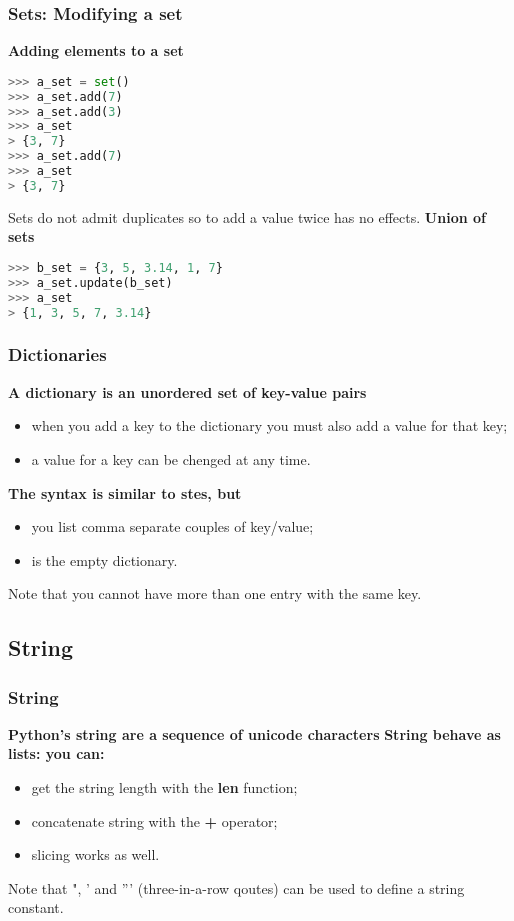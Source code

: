 \subsubsection{Sets: Modifying a set}
\textbf{Adding elements to a set}
\begin{lstlisting}[language=Python]
>>> a_set = set()
>>> a_set.add(7)
>>> a_set.add(3)
>>> a_set
> {3, 7}
>>> a_set.add(7)
>>> a_set
> {3, 7}
\end{lstlisting}
Sets do not admit duplicates so to add a value twice has no effects.
\textbf{Union of sets}
\begin{lstlisting}[language=Python]
>>> b_set = {3, 5, 3.14, 1, 7}
>>> a_set.update(b_set)
>>> a_set
> {1, 3, 5, 7, 3.14}
\end{lstlisting}

\subsubsection{Dictionaries}
\textbf{A dictionary is an unordered set of key-value pairs}
\begin{itemize}
	\item when you add a key to the dictionary you must also add a value for that key;
	\item a value for a key can be chenged at any time.
\end{itemize}
\textbf{The syntax is similar to stes, but}
\begin{itemize}
	\item you list comma separate couples of key/value;
	\item {} is the empty dictionary.
\end{itemize}
Note that you cannot have more than one entry with the same key.

\subsection{String}
\subsubsection{String}
\textbf{Python's string are a sequence of unicode characters}
\textbf{String behave as lists: you can:}
\begin{itemize}
	\item get the string length with the \textbf{len} function;
	\item concatenate string with the \textbf{+} operator;
	\item slicing works as well.
\end{itemize}
Note that ", ' and ''' (three-in-a-row qoutes) can be used to define a string constant.

